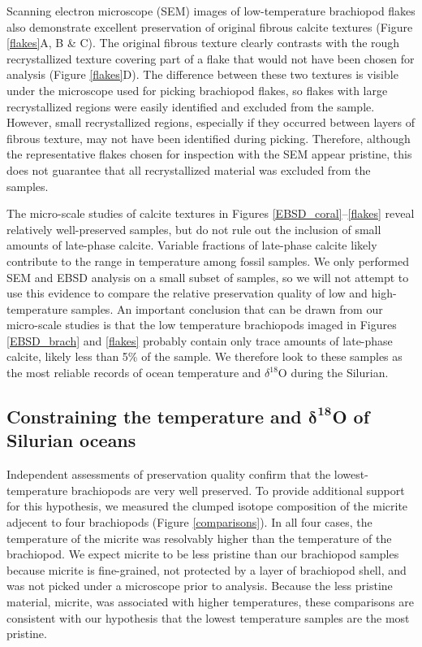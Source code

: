 \documentclass{article}
\newcommand{\deltao}{$\delta^{18}$}
\begin{document}
Scanning electron microscope (SEM) images of low-temperature brachiopod flakes also demonstrate excellent preservation of original fibrous calcite textures (Figure \ref{flakes}A, B \& C). The original fibrous texture clearly contrasts with the rough recrystallized texture covering part of a flake that would not have been chosen for analysis (Figure \ref{flakes}D). The difference between these two textures is visible under the microscope used for picking brachiopod flakes, so flakes with large recrystallized regions were easily identified and excluded from the sample. However, small recrystallized regions, especially if they occurred between layers of fibrous texture, may not have been identified during picking. Therefore, although the representative flakes chosen for inspection with the SEM appear pristine, this does not guarantee that all recrystallized material was excluded from the samples.

The micro-scale studies of calcite textures in Figures \ref{EBSD_coral}--\ref{flakes} reveal relatively well-preserved samples, but do not rule out the inclusion of small amounts of late-phase calcite. Variable fractions of late-phase calcite likely contribute to the range in temperature among fossil samples. We only performed SEM and EBSD analysis on a small subset of samples, so we will not attempt to use this evidence to compare the relative preservation quality of low and high-temperature samples. An important conclusion that can be drawn from our micro-scale studies is that the low temperature brachiopods imaged in Figures \ref{EBSD_brach} and \ref{flakes} probably contain only trace amounts of late-phase calcite, likely less than 5\% of the sample. We therefore look to these samples as the most reliable records of ocean temperature and \deltao O during the Silurian. 

\subsection{Constraining the temperature and $\mathbf{\delta^{18}}$O of Silurian oceans}

Independent assessments of preservation quality confirm that the lowest-temperature brachiopods are very well preserved. To provide additional support for this hypothesis, we measured the clumped isotope composition of the micrite adjecent to four brachiopods (Figure \ref{comparisons}). In all four cases, the temperature of the micrite was resolvably higher than the temperature of the brachiopod. We expect micrite to be less pristine than our brachiopod samples because micrite is fine-grained, not protected by a layer of brachiopod shell, and was not picked under a microscope prior to analysis. Because the less pristine material, micrite, was associated with higher temperatures, these comparisons are consistent with our hypothesis that the lowest temperature samples are the most pristine. 
\end{document}
